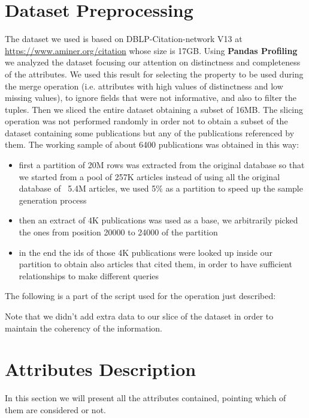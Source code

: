 \documentclass{Configuration_Files/PoliMi3i_thesis}
\begin{document}
\section{Dataset Preprocessing}
The dataset we used is based on DBLP-Citation-network V13 at \url{https://www.aminer.org/citation} whose size is 17GB. Using
\textbf{Pandas Profiling} we analyzed the dataset focusing our attention on distinctness and completeness of the attributes.
We used this result for selecting the property to be used during the merge operation (i.e. attributes with high values of distinctness
and low missing values), to ignore fields that were not informative, and also to filter the tuples. Then we sliced the entire
dataset obtaining a subset of 16MB. The slicing operation was not performed randomly in order not to obtain a subset of the
dataset containing some publications but any of the publications referenced by them. The working sample of about 6400 publications
was obtained in this way:
\begin{itemize}
    \item first a partition of 20M rows was extracted from the original database so that we started from a pool of 257K articles
        instead of using all the original database of ~5.4M articles, we used 5\% as a partition to speed up the sample generation
        process
    \item then an extract of 4K publications was used as a base, we arbitrarily picked the ones from position 20000 to 24000 of the partition
    \item in the end the ids of those 4K publications were looked up inside our partition to obtain also articles that cited
        them, in order to have sufficient relationships to make different queries
\end{itemize}
The following is a part of the script used for the operation just described:

\bigskip
Note that we didn't add extra data to our slice of the dataset in order to maintain the coherency of the information.

\section{Attributes Description}
In this section we will present all the attributes contained, pointing which of them are considered or not.
\end{document}
